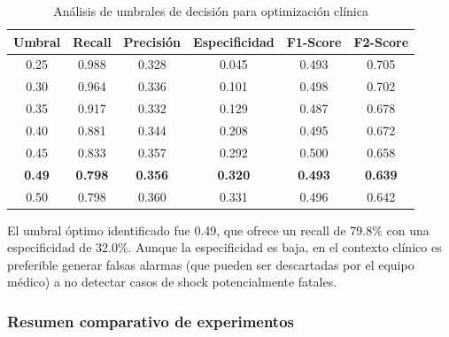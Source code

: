 \documentclass[12pt, letterpaper]{article}
\begin{document}
\begin{table}[H]
\centering
\caption{Análisis de umbrales de decisión para optimización clínica}
\label{tab:threshold-analysis}
\small
\begin{tabular}{|c|c|c|c|c|c|}
\hline
\textbf{Umbral} & \textbf{Recall} & \textbf{Precisión} & \textbf{Especificidad} & \textbf{F1-Score} & \textbf{F2-Score} \\ \hline
0.25 & 0.988 & 0.328 & 0.045 & 0.493 & 0.705 \\ \hline
0.30 & 0.964 & 0.336 & 0.101 & 0.498 & 0.702 \\ \hline
0.35 & 0.917 & 0.332 & 0.129 & 0.487 & 0.678 \\ \hline
0.40 & 0.881 & 0.344 & 0.208 & 0.495 & 0.672 \\ \hline
0.45 & 0.833 & 0.357 & 0.292 & 0.500 & 0.658 \\ \hline
\textbf{0.49} & \textbf{0.798} & \textbf{0.356} & \textbf{0.320} & \textbf{0.493} & \textbf{0.639} \\ \hline
0.50 & 0.798 & 0.360 & 0.331 & 0.496 & 0.642 \\ \hline
\end{tabular}
\end{table}

El umbral óptimo identificado fue 0.49, que ofrece un recall de 79.8\% con una especificidad de 32.0\%. Aunque la especificidad es baja, en el contexto clínico es preferible generar falsas alarmas (que pueden ser descartadas por el equipo médico) a no detectar casos de shock potencialmente fatales.

\subsubsection{Resumen comparativo de experimentos}
\end{document}
